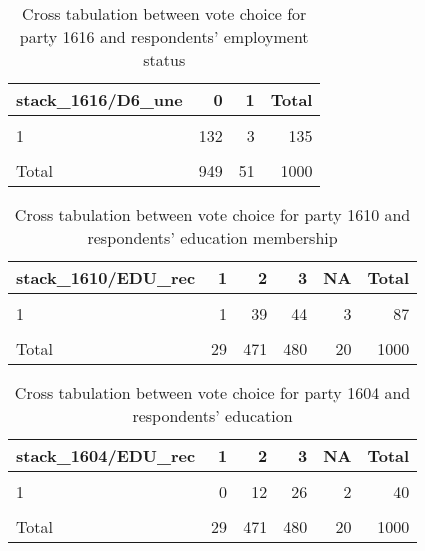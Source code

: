 \documentclass[
]{article}
\begin{document}
\begin{table}

\caption{\label{tab:unnamed-chunk-105}Cross tabulation between vote choice for party 1616 and respondents' employment status
                   \label{table:crosstab_4_lv}}
\centering
\begin{tabular}[t]{l|r|r|r}
\hline
stack\_1616/D6\_une & 0 & 1 & Total\\
\hline
\cellcolor{gray!6}{0} & \cellcolor{gray!6}{791} & \cellcolor{gray!6}{47} & \cellcolor{gray!6}{838}\\
\hline
1 & 132 & 3 & 135\\
\hline
\cellcolor{gray!6}{NA} & \cellcolor{gray!6}{26} & \cellcolor{gray!6}{1} & \cellcolor{gray!6}{27}\\
\hline
Total & 949 & 51 & 1000\\
\hline
\end{tabular}
\end{table}

\begin{table}

\caption{\label{tab:unnamed-chunk-105}Cross tabulation between vote choice for party 1610 and respondents' education
                   membership \label{table:crosstab_5_lv}}
\centering
\begin{tabular}[t]{l|r|r|r|r|r}
\hline
stack\_1610/EDU\_rec & 1 & 2 & 3 & NA & Total\\
\hline
\cellcolor{gray!6}{0} & \cellcolor{gray!6}{26} & \cellcolor{gray!6}{419} & \cellcolor{gray!6}{424} & \cellcolor{gray!6}{17} & \cellcolor{gray!6}{886}\\
\hline
1 & 1 & 39 & 44 & 3 & 87\\
\hline
\cellcolor{gray!6}{NA} & \cellcolor{gray!6}{2} & \cellcolor{gray!6}{13} & \cellcolor{gray!6}{12} & \cellcolor{gray!6}{0} & \cellcolor{gray!6}{27}\\
\hline
Total & 29 & 471 & 480 & 20 & 1000\\
\hline
\end{tabular}
\end{table}

\begin{table}

\caption{\label{tab:unnamed-chunk-105}Cross tabulation between vote choice for party 1604 and respondents' education
                  \label{table:crosstab_6_lv}}
\centering
\begin{tabular}[t]{l|r|r|r|r|r}
\hline
stack\_1604/EDU\_rec & 1 & 2 & 3 & NA & Total\\
\hline
\cellcolor{gray!6}{0} & \cellcolor{gray!6}{27} & \cellcolor{gray!6}{446} & \cellcolor{gray!6}{442} & \cellcolor{gray!6}{18} & \cellcolor{gray!6}{933}\\
\hline
1 & 0 & 12 & 26 & 2 & 40\\
\hline
\cellcolor{gray!6}{NA} & \cellcolor{gray!6}{2} & \cellcolor{gray!6}{13} & \cellcolor{gray!6}{12} & \cellcolor{gray!6}{0} & \cellcolor{gray!6}{27}\\
\hline
Total & 29 & 471 & 480 & 20 & 1000\\
\hline
\end{tabular}
\end{table}
\end{document}
